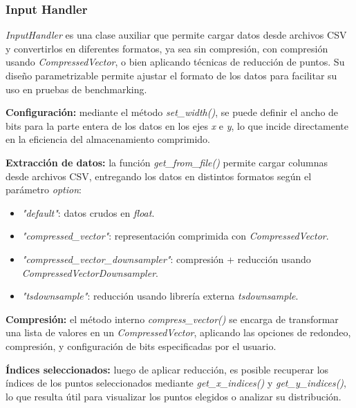 \subsubsection{Input Handler}

\textit{InputHandler} es una clase auxiliar que permite cargar datos desde archivos CSV y convertirlos en diferentes formatos, ya sea sin compresión, con compresión usando \textit{CompressedVector}, o bien aplicando técnicas de reducción de puntos. Su diseño parametrizable permite ajustar el formato de los datos para facilitar su uso en pruebas de benchmarking.

\vspace{0.5em}
\textbf{Configuración:} mediante el método \textit{set\_width()}, se puede definir el ancho de bits para la parte entera de los datos en los ejes \textit{x} e \textit{y}, lo que incide directamente en la eficiencia del almacenamiento comprimido.

\vspace{0.5em}
\textbf{Extracción de datos:} la función \textit{get\_from\_file()} permite cargar columnas desde archivos CSV, entregando los datos en distintos formatos según el parámetro \textit{option}:
\begin{itemize}
    \item \textit{"default"}: datos crudos en \textit{float}.
    \item \textit{"compressed\_vector"}: representación comprimida con \textit{CompressedVector}.
    \item \textit{"compressed\_vector\_downsampler"}: compresión + reducción usando \textit{CompressedVectorDownsampler}.
    \item \textit{"tsdownsample"}: reducción usando librería externa \textit{tsdownsample}.
\end{itemize}

\vspace{0.5em}
\textbf{Compresión:} el método interno \textit{compress\_vector()} se encarga de transformar una lista de valores en un \textit{CompressedVector}, aplicando las opciones de redondeo, compresión, y configuración de bits especificadas por el usuario.

\vspace{0.5em}
\textbf{Índices seleccionados:} luego de aplicar reducción, es posible recuperar los índices de los puntos seleccionados mediante \textit{get\_x\_indices()} y \textit{get\_y\_indices()}, lo que resulta útil para visualizar los puntos elegidos o analizar su distribución.

